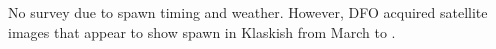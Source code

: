 No survey due to spawn timing and weather.
However, DFO acquired satellite images that appear to show
spawn in Klaskish from March  to .
